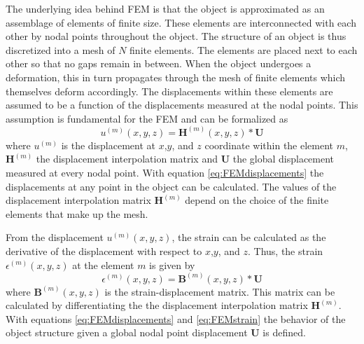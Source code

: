 \documentclass[11pt,a4paper]{report}
\begin{document}
The underlying idea behind FEM is that the object is approximated as an
assemblage of elements of finite size. These elements are interconnected with
each other by nodal points throughout the object. The structure of an object is
thus discretized into a mesh of $N$ finite elements. The elements are placed
next to each other so that no gaps remain in between. When the object undergoes a
deformation, this in turn propagates through the mesh of finite elements which
themselves deform accordingly. The displacements within these elements are assumed to be a function
of the displacements measured at the nodal points. This assumption is
fundamental for the FEM and can be formalized as
\begin{equation}\label{eq:FEMdisplacements}
u^{(m)}(x,y,z) = \mathbf{H}^{(m)}(x,y,z)*\mathbf{U}
\end{equation}
where $u^{(m)}$ is the displacement at $x$,$y$, and $z$ coordinate within the element $m$, $\mathbf{H}^{(m)}$
the displacement interpolation matrix and $\mathbf{U}$ the global
displacement measured at every nodal point. With equation
\ref{eq:FEMdisplacements} the displacements at any point in the object can be calculated.
The values of the displacement interpolation matrix $\mathbf{H}^{(m)}$ depend on
the choice of the finite elements that make up the mesh.

From the displacement $u^{(m)}(x,y,z)$, the strain can be calculated as the
derivative of the displacement with respect to $x$,$y$, and $z$. Thus, the
strain $\epsilon^{(m)}(x,y,z)$ at the element $m$ is given by  
\begin{equation}\label{eq:FEMstrain}
\epsilon^{(m)}(x,y,z) = \mathbf{B}^{(m)}(x,y,z)*\mathbf{U}
\end{equation}
where $\mathbf{B}^{(m)}(x,y,z)$ is the strain-displacement matrix. This matrix can
be calculated by differentiating the the displacement interpolation matrix
$\mathbf{H}^{(m)}$. With equations \ref{eq:FEMdisplacements} and \ref{eq:FEMstrain} the behavior of
the object structure given a global nodal point displacement $\mathbf{U}$ is
defined. 
\end{document}
